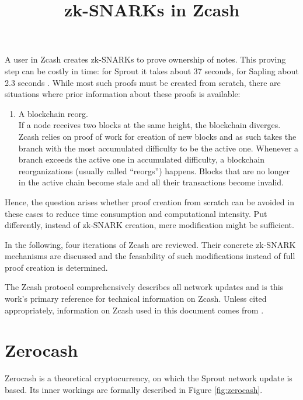 \documentclass{article}
\title{zk-SNARKs in Zcash}
\date{}
\begin{document}
\maketitle

A user in Zcash creates zk-SNARKs to prove ownership of notes.
This proving step can be costly in time: for Sprout it takes about 37 seconds, for Sapling about 2.3 seconds \cite{electriccoin:provingtime}.
While most such proofs must be created from scratch, there are situations where prior information about these proofs is available:

\begin{enumerate}
        \item A blockchain reorg. \\
        If a node receives two blocks at the same height, the blockchain diverges.
        Zcash relies on proof of work for creation of new blocks and as such takes
        the branch with the most accumulated difficulty to be the active one.
        Whenever a branch exceeds the active one in accumulated difficulty, a blockchain reorganizations (usually called ``reorgs'') happens.
        Blocks that are no longer in the active chain become stale and all their transactions become invalid.
\end{enumerate}

Hence, the question arises whether proof creation from scratch can be avoided in these cases to reduce time consumption and computational intensity.
Put differently, instead of zk-SNARK creation, mere modification might be sufficient.

In the following, four iterations of Zcash are reviewed.
Their concrete zk-SNARK mechanisms are discussed and the feasability of such modifications instead of full proof creation is determined.

The Zcash protocol \cite{hopwood:zcash} comprehensively describes all network updates and is this work's primary reference for technical information on Zcash.
Unless cited appropriately, information on Zcash used in this document comes from \cite{hopwood:zcash}.

\section{Zerocash}

Zerocash \cite{bensasson:zerocash} is a theoretical cryptocurrency, on which the Sprout network update is based.
Its inner workings are formally described in Figure \ref{fig:zerocash}.
\end{document}
